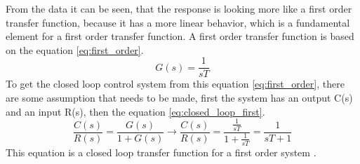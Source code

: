 From the data it can be seen, that the response is looking more like a first order transfer function, because it has a more linear behavior, which is a fundamental element for a first order transfer function. A first order transfer function is based on the equation \ref{eq:first_order}.
\begin{equation}\label{eq:first_order}
    G(s)=\frac{1}{sT}
\end{equation}
To get the closed loop control system from this equation \ref{eq:first_order}, there are some assumption that needs to be made, first the system has an output C(s) and an input R(s), then the equation \ref{eq:closed_loop_first}.
\begin{equation}\label{eq:closed_loop_first}
    \frac{C(s)}{R(s)}=\frac{G(s)}{1+G(s)} \to \frac{C(s)}{R(s)}= \frac{\frac{1}{sT}}{1+\frac{1}{sT}}=\frac{1}{sT+1}
\end{equation}
This equation is a closed loop transfer function for a first order system \cite{digital_control}. 



















